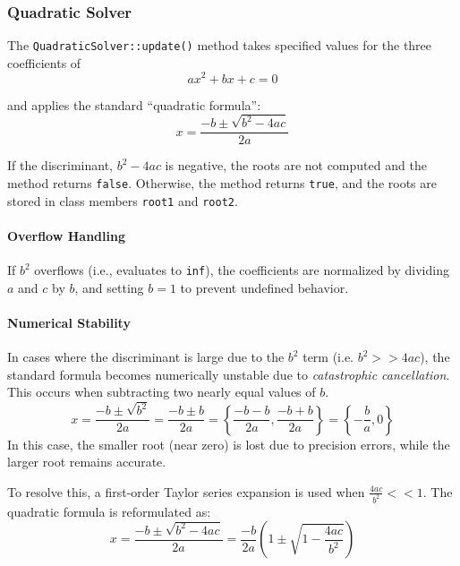 \documentclass[11pt,fleqn]{report}
\begin{document}
\subsubsection{Quadratic Solver}
The \texttt{QuadraticSolver::update()} method takes specified values
for the three coefficients of
\begin{equation*}
ax^2 + bx + c = 0
\end{equation*}

and applies the standard ``quadratic formula'':
\begin{equation*}
x = \frac{ -b \pm \sqrt{b^2 - 4 ac}}{2a}
\end{equation*}

If the discriminant, $b^2 - 4 ac$ is negative, the roots are not computed and the method returns
\texttt{false}. Otherwise, the method returns \texttt{true}, and the roots are stored in class 
members \texttt{root1} and \texttt{root2}.

\paragraph{Overflow Handling}
If $b^2$ overflows (i.e., evaluates to \texttt{inf}), the coefficients are normalized by dividing 
$a$ and $c$ by $b$, and setting $b = 1$ to prevent undefined behavior.

\paragraph{Numerical Stability}
In cases where the discriminant is large due to the $b^2$ term (i.e. $b^2 >> 4ac$), the standard formula
becomes numerically unstable due to \textit{catastrophic cancellation}. This occurs when subtracting
two nearly equal values of $b$.
\begin{equation*}
x = \frac{ -b \pm \sqrt{b^2}}{2a} = \frac{ -b \pm b}{2a} = \left \{\frac{ -b - b}{2a}, \frac{ -b + b}{2a} \right \} = \left \{-\frac{b}{a}, 0 \right \}
\end{equation*}
In this case, the smaller root (near zero) is lost due to precision errors, while the larger
root remains accurate.

To resolve this, a first-order Taylor series expansion is used when $\frac{4ac}{b^2} << 1$. The 
quadratic formula is reformulated as:
\begin{equation*}
x = \frac{ -b \pm \sqrt{b^2 - 4 ac}}{2a} = \frac{-b}{2a} \left (1 \pm \sqrt{1 - \frac{4ac}{b^2}} \right )
\end{equation*}
\end{document}
